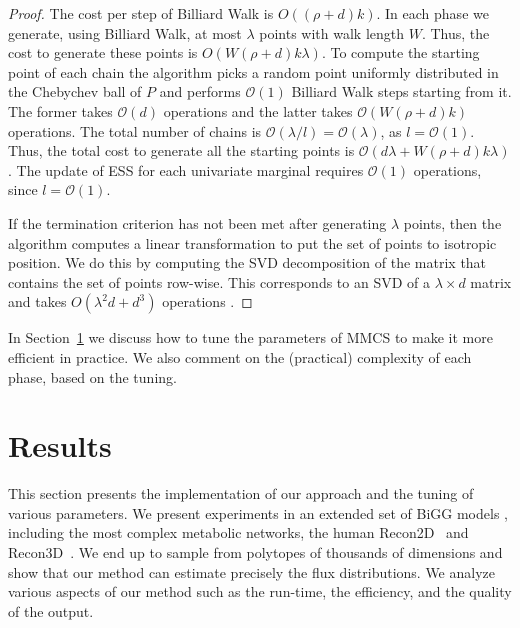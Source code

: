    
   \begin{proof}
      The cost per step of Billiard Walk is $O((\rho + d)k)$. In each phase we
      generate, using Billiard Walk, at most $\lambda$ points with walk length $W$.
      Thus, the cost to generate these points is $O(W(\rho + d)k\lambda)$.     
      To compute the starting point of each chain the algorithm picks a random point
      uniformly distributed in the Chebychev ball of $P$ and performs $\mathcal{O}(1)$
      Billiard Walk steps starting from it.
      The former  takes $\mathcal{O}(d)$ operations and the latter  takes $\mathcal{O}(W(\rho + d)k)$ operations.
      The total number of chains is 
      $\mathcal{O}(\lambda / l) = \mathcal{O}(\lambda)$, 
      as $l=\mathcal{O}(1)$.
      Thus, the total cost to generate all the starting points is 
      $\mathcal{O}(d\lambda + W(\rho + d)k\lambda)$. 
      The update of ESS for each univariate marginal requires $\mathcal{O}(1)$ operations, 
      since $l = \mathcal{O}(1)$.

      If the termination criterion has not been met after generating $\lambda$ points,
      then the algorithm computes a linear transformation to put the set of points to isotropic position. 
      We do this by computing the SVD decomposition of the matrix that
      contains the set of points row-wise. This corresponds to an SVD of a
      $\lambda \times d$ matrix and takes $O(\lambda^2d + d^3)$ operations
      \citep{golub13}.
   \end{proof}
   \fi 

   In Section~\ref{sec:experiments} we discuss how to tune the parameters of MMCS
   to make it more efficient in practice. We also comment on the (practical)
   complexity of each phase, based on the tuning.



\section{Results}
\label{sec:experiments}

   This section presents the implementation of our approach and the tuning of various parameters. 
   We present experiments in an extended set of BiGG models \citep{king2016bigg}, including the most complex metabolic networks, the human Recon2D~\citep{swainston16} and Recon3D~\citep{brunk2018recon3d}. 
   We end up to sample from polytopes of thousands of dimensions and show that our method can estimate precisely the flux distributions. 
   We analyze various aspects of our method such as the run-time, the efficiency, and the quality of the output.

